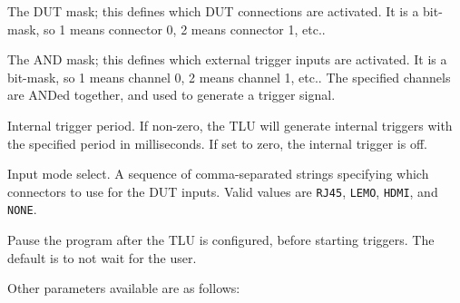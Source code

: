 \begin{description}
The DUT mask; this defines which DUT connections are activated.  It is a bit-mask, so 1 means
connector 0, 2 means connector 1, etc..

The AND mask; this defines which external trigger inputs are activated. It is a bit-mask, so 1
means channel 0, 2 means channel 1, etc.. The specified channels are ANDed together, and used to
generate a trigger signal.

Internal trigger period.  If non-zero, the \gls{TLU} will generate internal triggers with the
specified period in milliseconds. If set to zero, the internal trigger is off.

Input mode select. A sequence of comma-separated strings specifying which connectors to use for the
DUT inputs. Valid values are \texttt{RJ45}, \texttt{LEMO}, \texttt{HDMI}, and \texttt{NONE}.

Pause the program after the \gls{TLU} is configured, before starting triggers. The default is to not
wait for the user.
\end{description}

Other parameters available are as follows:

